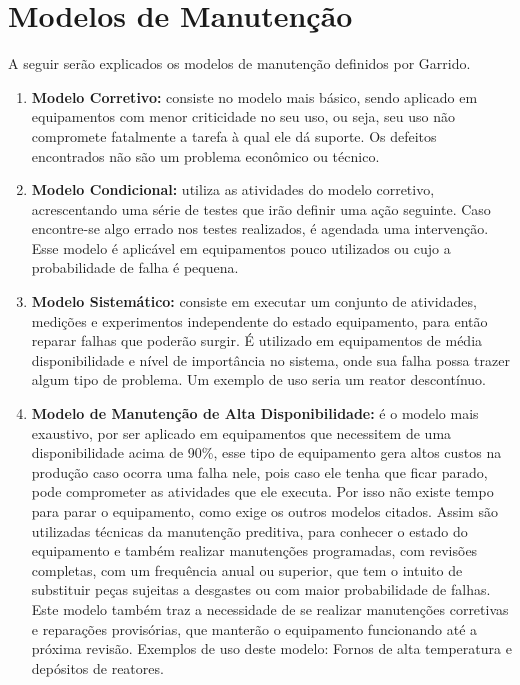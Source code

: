 \section{Modelos de Manutenção}
\label{sec_modelos_manutencao}

A seguir serão explicados os modelos de manutenção definidos por Garrido.

\begin{enumerate}
	\item \textbf{Modelo Corretivo:} consiste no modelo mais básico, sendo aplicado em equipamentos com menor criticidade no seu uso, ou seja, seu uso não compromete fatalmente a tarefa à qual ele dá suporte. Os defeitos encontrados não são um problema econômico ou técnico. 
	\item \textbf{Modelo Condicional:} utiliza as atividades do modelo corretivo, acrescentando uma série de testes que irão definir uma ação seguinte. Caso encontre-se algo errado nos testes realizados, é agendada uma intervenção. Esse modelo é aplicável em equipamentos pouco utilizados ou cujo a probabilidade de falha é pequena.
	\item \textbf{Modelo Sistemático:} consiste em executar um conjunto de atividades, medições e experimentos independente do estado equipamento, para então reparar falhas que poderão surgir. É utilizado em equipamentos de média disponibilidade e nível de importância no sistema, onde sua falha possa trazer algum tipo de problema. Um exemplo de uso seria um reator descontínuo. 
	\item \textbf{Modelo de Manutenção de Alta Disponibilidade:} é o modelo mais exaustivo, por ser aplicado em equipamentos que necessitem de uma disponibilidade acima de 90\%, esse tipo de equipamento gera altos custos na produção caso ocorra uma falha nele, pois caso ele tenha que ficar parado, pode comprometer as atividades que ele executa. Por isso não existe tempo para parar o equipamento, como exige os outros modelos citados. Assim são utilizadas técnicas da manutenção preditiva, para conhecer o estado do equipamento e também realizar manutenções programadas, com revisões completas, com um frequência anual ou superior, que tem o intuito de substituir peças sujeitas a desgastes ou com maior probabilidade de falhas. 
	\\
	Este modelo também traz a necessidade de se realizar manutenções corretivas e reparações provisórias, que manterão o equipamento funcionando até a próxima revisão. Exemplos de uso deste modelo: Fornos de alta temperatura e depósitos de reatores.
\end{enumerate} 

